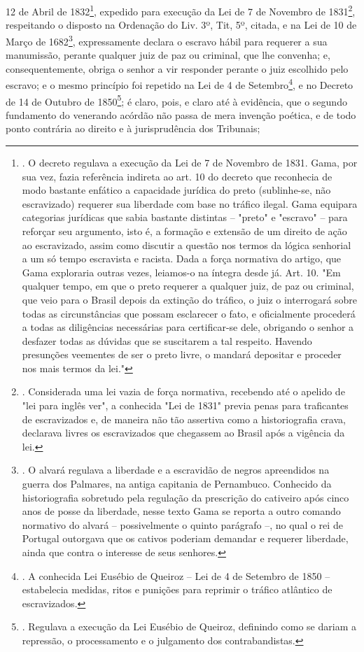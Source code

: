 12 de Abril de 1832\footnote{. O decreto regulava a execução da Lei de 7
  de Novembro de 1831. Gama, por sua vez, fazia referência indireta ao
  art. 10 do decreto que reconhecia de modo bastante enfático a
  capacidade jurídica do preto (sublinhe-se, não escravizado) requerer
  sua liberdade com base no tráfico ilegal. Gama equipara categorias
  jurídicas que sabia bastante distintas -- "preto" e "escravo" -- para
  reforçar seu argumento, isto é, a formação e extensão de um direito de
  ação ao escravizado, assim como discutir a questão nos termos da
  lógica senhorial a um só tempo escravista e racista. Dada a força
  normativa do artigo, que Gama exploraria outras vezes, leiamos-o na
  íntegra desde já. Art. 10. "Em qualquer tempo, em que o preto requerer
  a qualquer juiz, de paz ou criminal, que veio para o Brasil depois da
  extinção do tráfico, o juiz o interrogará sobre todas as
  circunstâncias que possam esclarecer o fato, e oficialmente procederá
  a todas as diligências necessárias para certificar-se dele, obrigando
  o senhor a desfazer todas as dúvidas que se suscitarem a tal respeito.
  Havendo presunções veementes de ser o preto livre, o mandará depositar
  e proceder nos mais termos da lei."}, expedido para execução da Lei de
7 de Novembro de 1831\footnote{. Considerada uma lei vazia de força
  normativa, recebendo até o apelido de "lei para inglês ver", a
  conhecida "Lei de 1831" previa penas para traficantes de escravizados
  e, de maneira não tão assertiva como a historiografia crava, declarava
  livres os escravizados que chegassem ao Brasil após a vigência da lei.},
respeitando o disposto na Ordenação do Liv. 3º, Tit, 5º, citada, e na
Lei de 10 de Março de 1682\footnote{. O alvará regulava a liberdade e a
  escravidão de negros apreendidos na guerra dos Palmares, na antiga
  capitania de Pernambuco. Conhecido da historiografia sobretudo pela
  regulação da prescrição do cativeiro após cinco anos de posse da
  liberdade, nesse texto Gama se reporta a outro comando normativo do
  alvará -- possivelmente o quinto parágrafo --, no qual o rei de
  Portugal outorgava que os cativos poderiam demandar e requerer
  liberdade, ainda que contra o interesse de seus senhores.},
expressamente declara o escravo hábil para requerer a sua manumissão,
perante qualquer juiz de paz ou criminal, que lhe convenha; e,
consequentemente, obriga o senhor a vir responder perante o juiz
escolhido pelo escravo; e o mesmo princípio foi repetido na Lei de 4 de
Setembro\footnote{. A conhecida Lei Eusébio de Queiroz -- Lei de 4 de
  Setembro de 1850 -- estabelecia medidas, ritos e punições para
  reprimir o tráfico atlântico de escravizados.}, e no Decreto de 14 de
Outubro de 1850\footnote{. Regulava a execução da Lei Eusébio de
  Queiroz, definindo como se dariam a repressão, o processamento e o
  julgamento dos contrabandistas.}; é claro, pois, e claro até à
evidência, que o segundo fundamento do venerando acórdão não passa de
mera invenção poética, e de todo ponto contrária ao direito e à
jurisprudência dos Tribunais;

